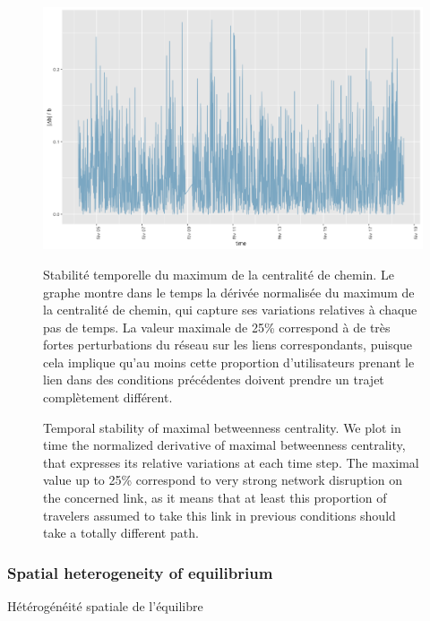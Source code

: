 \begin{figure}
\includegraphics[width=\textwidth]{Figures/TransportationEquilibrium/gr4}
\caption{Temporal stability of maximal betweenness centrality. We plot in time the normalized derivative of maximal betweenness centrality, that expresses its relative variations at each time step. The maximal value up to 25\% correspond to very strong network disruption on the concerned link, as it means that at least this proportion of travelers assumed to take this link in previous conditions should take a totally different path.}{Stabilité temporelle du maximum de la centralité de chemin. Le graphe montre dans le temps la dérivée normalisée du maximum de la centralité de chemin, qui capture ses variations relatives à chaque pas de temps. La valeur maximale de 25\% correspond à de très fortes perturbations du réseau sur les liens correspondants, puisque cela implique qu'au moins cette proportion d'utilisateurs prenant le lien dans des conditions précédentes doivent prendre un trajet complètement différent.}
\label{fig:fig-4}
\end{figure}





\subsubsection{Spatial heterogeneity of equilibrium}{Hétérogénéité spatiale de l'équilibre}



